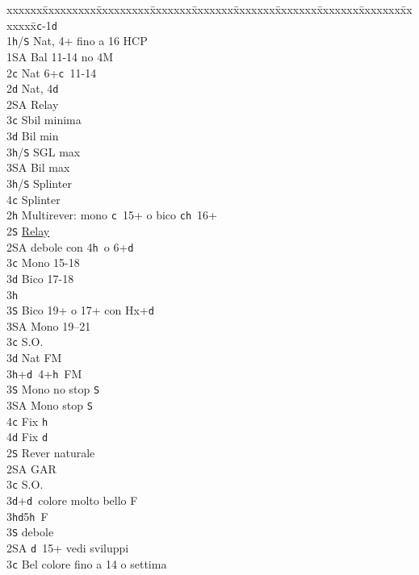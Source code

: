 \documentclass[a4paper,italian]{article}
\newcommand{\BS}{\small{\texttt{S}}}
\newcommand{\BC}{\small{\texttt{c}}}
\newcommand{\BD}{\small{\texttt{d}}}
\newcommand{\BH}{\small{\texttt{h}}}
\newenvironment{bidtable}
{\begin{tabbing}

    xxxxxx\=xxxxxxxxx\=xxxxxxxxx\=xxxxxxx\=xxxxxxx\=xxxxxxx\=xxxxxxx\=xxxxxxx\=xxxxxxx\=xxxxxxx\=\kill}
{\end{tabbing} }%
\begin{document}
\begin{multicols}{2}
    \begin{bidtable}
        1\BC-1\BD\+\\
        1\BH/\BS \> Nat, 4+ fino a 16 HCP\\
        1\small{SA} \> Bal 11-14 no 4M\\
        2\BC \> Nat 6+\BC\ 11-14\\
        2\BD \> Nat, 4\BD \+\\
        2\small{SA} \> Relay\+\\
        3\BC \> Sbil minima\\
        3\BD \> Bil min\\
        3\BH/\BS \> SGL max\\
        3\small{SA} \> Bil max\-\\
        3\BH/\BS \> Splinter\\
        4\BC \> Splinter\-\\
        2\BH \> Multirever: mono \BC\ 15+ o bico \BC \BH\ 16+\+\\
        2\BS \> \hyperref[multirever]{Relay}\\
        2\small{SA} \> debole con 4\BH\ o 6+\BD \+\\
        3\BC \> Mono 15-18\\
        3\BD \> Bico 17-18\\
        3\BH {}\\
        3\BS \> Bico 19+ o 17+ con Hx+\BD\\
        3\small{SA} \> Mono 19--21\-\\
        3\BC \> S.O.\\
        3\BD \> Nat FM\\
        3\BH {}+\BD\ 4+\BH\ FM\+\\
        3\BS \> Mono no stop \BS \\
        3\small{SA} \> Mono stop \BS \\
        4\BC \> Fix \BH \\
        4\BD \> Fix \BD \-\-\\
        2\BS \> Rever naturale\+\\
        2\small{SA} \> GAR\\
        3\BC \> S.O.\\
        3\BD {}+\BD\ colore molto bello F\\
        3\BH {}\BD 5\BH\ F\\
        3\BS \> debole\-\\
        2\small{SA} \BD\ 15+ vedi sviluppi\\
        3\BC \> Bel colore fino a 14 o settima\+\\

\end{bidtable}
\end{multicols}
\end{document}
